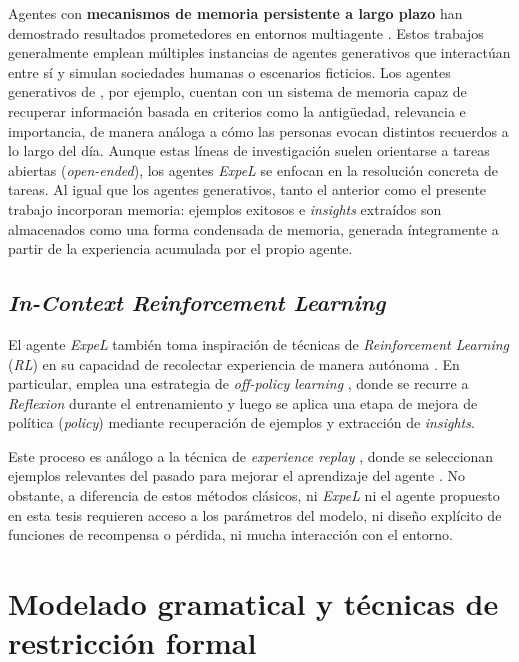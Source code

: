 Agentes con \textbf{mecanismos de memoria persistente a largo plazo} han demostrado resultados prometedores en entornos multiagente \parencite{park2023generative, maas2023infinity, qian2023communicative}. Estos trabajos generalmente emplean múltiples instancias de agentes generativos que interactúan entre sí y simulan sociedades humanas o escenarios ficticios. Los agentes generativos de \textcite{park2023generative}, por ejemplo, cuentan con un sistema de memoria capaz de recuperar información basada en criterios como la antigüedad, relevancia e importancia, de manera análoga a cómo las personas evocan distintos recuerdos a lo largo del día. Aunque estas líneas de investigación suelen orientarse a tareas abiertas (\textit{open-ended}), los agentes \textit{ExpeL} se enfocan en la resolución concreta de tareas. Al igual que los agentes generativos, tanto el anterior como el presente trabajo incorporan memoria: ejemplos exitosos e \textit{insights} extraídos son almacenados como una forma condensada de memoria, generada íntegramente a partir de la experiencia acumulada por el propio agente.

\subsection{\textit{In-Context Reinforcement Learning}}

El agente \textit{ExpeL} también toma inspiración de técnicas de \textit{Reinforcement Learning} (\textit{RL}) en su capacidad de recolectar experiencia de manera autónoma \parencite{sutton1998reinforcement}. En particular, emplea una estrategia de \textit{off-policy learning} \parencite{watkins1992q}, donde se recurre a \textit{Reflexion} durante el entrenamiento y luego se aplica una etapa de mejora de política (\textit{policy}) mediante recuperación de ejemplos y extracción de \textit{insights}.

Este proceso es análogo a la técnica de \textit{experience replay} \parencite{lin1992self}, donde se seleccionan ejemplos relevantes del pasado para mejorar el aprendizaje del agente \parencite{schaul2015prioritized, yue2023offline}. No obstante, a diferencia de estos métodos clásicos, ni \textit{ExpeL} ni el agente propuesto en esta tesis requieren acceso a los parámetros del modelo, ni diseño explícito de funciones de recompensa o pérdida, ni mucha interacción con el entorno.

\section{Modelado gramatical y técnicas de restricción formal}

